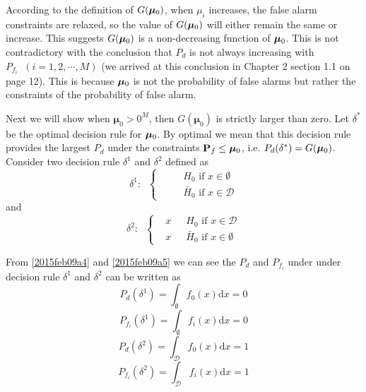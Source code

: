 According to the definition of $G(\boldsymbol{\mu}_0)$, when $\mu_i$ increases, the false alarm constraints are relaxed, 
so the value of $G(\boldsymbol{\mu}_0)$ will either remain the same or increase. 
This suggests $G(\boldsymbol{\mu}_0)$ is a non-decreasing function of $\boldsymbol{\mu}_0$. 
This is not contradictory with the conclusion that 
$P_d$ is not always increasing with $P_{f_i}\;\;(i=1, 2, \cdots, M)$  (we arrived at this conclusion in Chapter 2 section 1.1 on page 12).  This is because $\boldsymbol{\mu}_0$ is not the probability of false alarms but rather the constraints of the probability of false alarm. 

Next we will show when $\boldsymbol{\mu}_0 > 0^M$, then $G(\boldsymbol{\mu}_0)$ is strictly larger than zero.
Let $\delta^\ast$ be the optimal decision rule for $\boldsymbol{\mu}_0$. By optimal  we mean that this decision rule provides the largest $P_d$ under the constraints $\mathbf{P}_f \leq \boldsymbol{\mu}_0$, i.e. $P_d(\delta^\ast) = G(\boldsymbol{\mu}_0)$. Consider two decision rule $\delta^1$ and $\delta^2$ defined as 
\begin{equation}
  \label{2015feb09a4}
  \delta^1:\;\; \begin{cases}
    & \;\;\;\text{ $H_0$ if } x \in \emptyset \\
    & \;\;\;\text{ $\bar{H}_0$ if } x \in \mathcal{D}
  \end{cases}
\end{equation}
and
\begin{equation}
  \label{2015feb09a5}
  \delta^2:\;\; \begin{cases}
    &x \;\;\;\text{ $H_0$ if } x \in \mathcal{D} \\
    &x \;\;\;\text{ $\bar{H}_0$ if } x \in \emptyset
  \end{cases}
\end{equation}

From \eqref{2015feb09a4} and \eqref{2015feb09a5} we can see the $P_d$ and $P_{f_i}$ under under decision rule $\delta^1$ and $\delta^2$ can be written as
\begin{equation}
  P_d(\delta^1) = \int_{\emptyset}f_0(x)\mathrm{d}x = 0
\end{equation}
\begin{equation}
    P_{f_i}(\delta^1) = \int_{\emptyset}f_i(x)\mathrm{d}x = 0
\end{equation}
\begin{equation}
    P_d(\delta^2) = \int_{\mathcal{D}}f_0(x)\mathrm{d}x = 1
\end{equation}
\begin{equation}
    P_{f_i}(\delta^2) = \int_{\mathcal{D}}f_i(x)\mathrm{d}x = 1
\end{equation}

